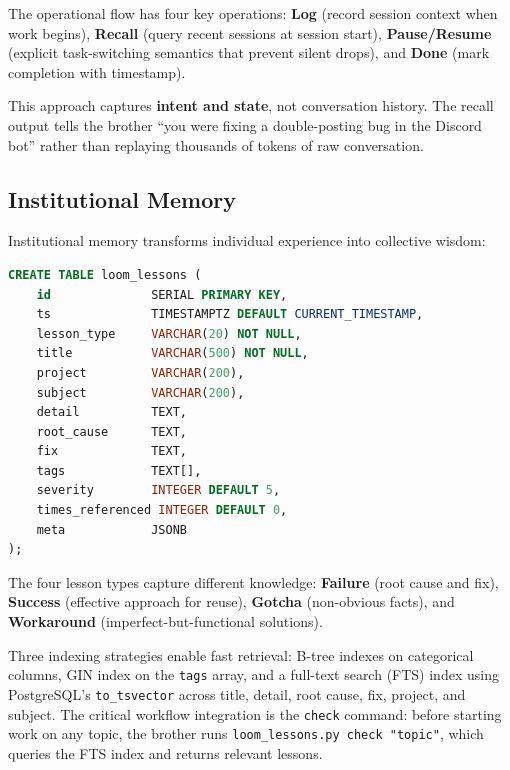 \documentclass[11pt,a4paper]{article}
\begin{document}
The operational flow has four key operations: \textbf{Log} (record session context when work begins), \textbf{Recall} (query recent sessions at session start), \textbf{Pause/Resume} (explicit task-switching semantics that prevent silent drops), and \textbf{Done} (mark completion with timestamp).

This approach captures \textbf{intent and state}, not conversation history. The recall output tells the brother ``you were fixing a double-posting bug in the Discord bot'' rather than replaying thousands of tokens of raw conversation.



\subsection{Institutional Memory}
\label{sec:institutional-memory}

Institutional memory transforms individual experience into collective wisdom:

\begin{lstlisting}[language=SQL,caption={Institutional lessons schema.}]
CREATE TABLE loom_lessons (
    id              SERIAL PRIMARY KEY,
    ts              TIMESTAMPTZ DEFAULT CURRENT_TIMESTAMP,
    lesson_type     VARCHAR(20) NOT NULL,
    title           VARCHAR(500) NOT NULL,
    project         VARCHAR(200),
    subject         VARCHAR(200),
    detail          TEXT,
    root_cause      TEXT,
    fix             TEXT,
    tags            TEXT[],
    severity        INTEGER DEFAULT 5,
    times_referenced INTEGER DEFAULT 0,
    meta            JSONB
);
\end{lstlisting}

The four lesson types capture different knowledge: \textbf{Failure} (root cause and fix), \textbf{Success} (effective approach for reuse), \textbf{Gotcha} (non-obvious facts), and \textbf{Workaround} (imperfect-but-functional solutions).

Three indexing strategies enable fast retrieval: B-tree indexes on categorical columns, GIN index on the \texttt{tags} array, and a full-text search (FTS) index using PostgreSQL's \texttt{to\_tsvector} across title, detail, root cause, fix, project, and subject. The critical workflow integration is the \texttt{check} command: before starting work on any topic, the brother runs \texttt{loom\_lessons.py check "topic"}, which queries the FTS index and returns relevant lessons.
\end{document}
